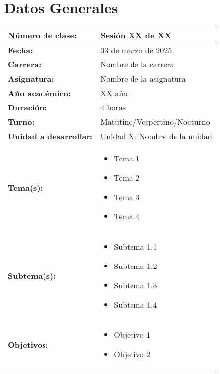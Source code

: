 \section{Datos Generales}

\begin{xltabular}{\linewidth}{@{}>{\bfseries}X X@{}}
    \toprule
    Número de clase:                           & Sesión XX de XX               \\
    \midrule
    Fecha:                                     & 03 de marzo de 2025           \\
    \midrule
    Carrera:                                   & Nombre de la carrera          \\
    \midrule
    Asignatura:                                & Nombre de la asignatura       \\
    \midrule
    Año académico:                             & XX año                        \\
    \midrule
    Duración:                                  & 4 horas                       \\
    \midrule
    Turno:                                     & Matutino/Vespertino/Nocturno  \\
    \midrule
    Unidad a desarrollar:                      & Unidad X: Nombre de la unidad \\
    \midrule
    Tema(s):                                   & \begin{itemize}
        \item Tema 1
        \item Tema 2
        \item Tema 3
        \item Tema 4
    \end{itemize}           \\
    \midrule
    Subtema(s):                                & \begin{itemize}
        \item Subtema 1.1
        \item Subtema 1.2
        \item Subtema 1.3
        \item Subtema 1.4
    \end{itemize}        \\
    \midrule
    Objetivos:                                 & \begin{itemize}
        \item Objetivo 1
        \item Objetivo 2

\end{itemize}
\end{xltabular}
